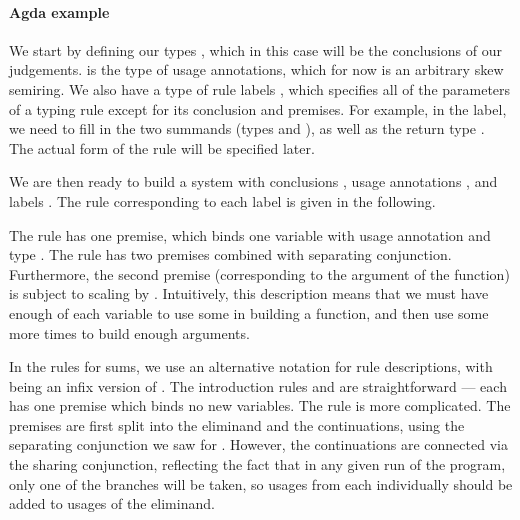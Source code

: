 \documentclass[a4paper]{article}
\begin{document}
\paragraph{Agda example}

We start by defining our types , which in this case will be the
conclusions of our judgements.
 is the type of usage annotations, which for now is an
arbitrary skew semiring.
We also have a type of rule labels , which specifies all of
the parameters of a typing rule except for its conclusion and premises.
For example, in the  label, we need to fill in
the two summands (types  and ), as well as the return
type .
The actual form of the rule will be specified later.

\exItypes{} \exIlabels{}

We are then ready to build a system  with conclusions
, usage annotations , and labels
.
The rule corresponding to each label is given in the following.

The  rule has one premise, which binds one
variable with usage annotation  and type .
The  rule has two premises combined with
separating conjunction.
Furthermore, the second premise (corresponding to the argument of the function)
is subject to scaling by .
Intuitively, this description means that we must have enough of each variable to
use some in building a function, and then use some more  times to
build enough arguments.

\exIfunrules{}

In the rules for sums, we use an alternative notation for rule descriptions,
with \AgdaFunction{{---}{---}} being an infix version of
.
The introduction rules  and
 are straightforward --- each has one
premise which binds no new variables.
The  rule is more complicated.
The premises are first split into the eliminand and the continuations, using the
separating conjunction we saw for .
However, the continuations are connected via the sharing conjunction, reflecting
the fact that in any given run of the program, only one of the branches will be
taken, so usages from each individually should be added to usages of the
eliminand.
\end{document}
